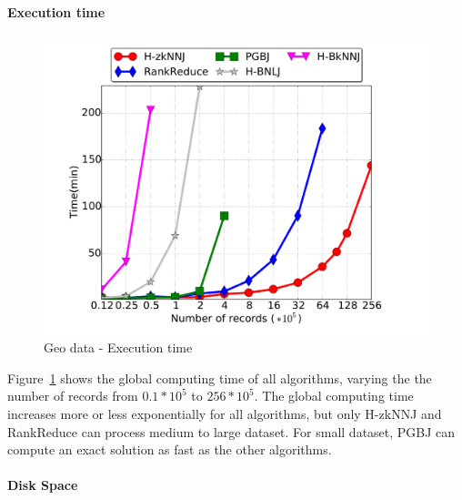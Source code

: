 \paragraph*{Execution time} 
\begin{figure}[!h]
   \centering
    \includegraphics[scale=0.28]{img-perf/geo/data/time.pdf} 
     \caption{Geo data - Execution time\label{geo_data_time}}
\end{figure}

Figure~\ref{geo_data_time} shows the global computing time of all algorithms, varying the 
the number of records from $0.1*10^{5}$ to $256*10^{5}$. The global computing time increases more or less exponentially for 
all algorithms, but only H-zkNNJ and RankReduce can process medium to large dataset. For small dataset, PGBJ can compute an 
exact solution as fast as the other algorithms. 
\paragraph*{Disk Space}
        
